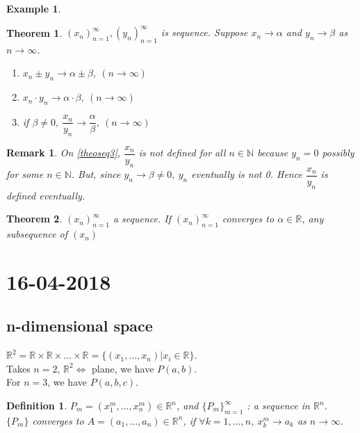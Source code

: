 \documentclass[a4paper,10pt]{article}
\newtheorem{remark}{Remark}
\newtheorem{theo}{Theorem}
\newtheorem{defi}{Definition}
\newtheorem{ex}{Example}
\begin{document}
\begin{ex}
	
\end{ex}

\begin{theo}
	$ (x_{n})_{n=1}^{\infty} , (y_{n})_{n=1}^{\infty} $ is sequence. Suppose $ x_{n} \rightarrow \alpha $ and $ y_{n} \rightarrow \beta $ as $ n\rightarrow \infty $.
	\begin{enumerate}
		\item $ x_{n} \pm y_{n} \rightarrow \alpha \pm \beta , \ (n \rightarrow \infty) $
		\item $ x_{n} \cdot y_{n} \rightarrow \alpha \cdot \beta , \ (n \rightarrow \infty) $
		\item \label{theoseq3} if $ \beta \neq 0, \ \dfrac{x_{n}}{y_{n}} \rightarrow \dfrac{\alpha}{\beta} , \ (n \rightarrow \infty) $
	\end{enumerate}
\end{theo}

\begin{remark}
	On \ref{theoseq3}, $ \dfrac{x_{n}}{y_{n}} $ is not defined for all $ n \in \mathbb{N} $ because $ y_{n}=0 $ possibly for some $ n \in \mathbb{N} $. But, since $ y_{n} \rightarrow \beta \neq 0, \ y_{n} $ eventually is not 0. Hence $ \dfrac{x_{n}}{y_{n}} $ is defined eventually.
\end{remark}

\begin{theo}
	$ (x_{n})_{n=1}^{\infty} $ a sequence. If $ (x_{n})_{n=1}^{\infty} $ converges to $ \alpha \in \mathbb{R} $, any subsequence of $ (x_{n}) $
\end{theo}

\section{16-04-2018}

\subsection{n-dimensional space}
$ \mathbb{R}^2 = \mathbb{R} \times \mathbb{R} \times \dots \times \mathbb{R}  = \{ (x_{1}, \dots, x_{n}) | x_{i}\in \mathbb{R} \} $.\\
Takes $ n=2 $, $ \mathbb{R}^2  \Leftrightarrow $ plane, we have $ P(a,b) $.\\
For $ n=3 $, we have $ P(a,b,c) $.

\begin{defi}
	$ P_{m} = (x_{1}^{m}, \dots, x_{n}^{m}) \in \mathbb{R}^n$, and $ \{ P_{m} \}_{m=1}^{\infty} $ :  a sequence in $ \mathbb{R}^{n} $.\\
	 $ \{P_{m}\} $ converges to $ A = (a_{1}, \dots , a_{n}) \in \mathbb{R}^n $, if $ \forall k=1, \dots, n , \ x_{k}^{m} \rightarrow a_{k} $ as $ n \rightarrow \infty $.
\end{defi}
\end{document}
